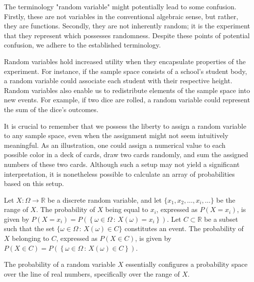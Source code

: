 The terminology "random variable" might potentially lead to some confusion. Firstly, these are not variables in the conventional algebraic sense, but rather, they are functions. Secondly, they are not inherently random; it is the experiment that they represent which possesses randomness. Despite these points of potential confusion, we adhere to the established terminology.

Random variables hold increased utility when they encapsulate properties of the experiment. For instance, if the sample space consists of a school's student body, a random variable could associate each student with their respective height. Random variables also enable us to redistribute elements of the sample space into new events. For example, if two dice are rolled, a random variable could represent the sum of the dice's outcomes.

It is crucial to remember that we possess the liberty to assign a random variable to any sample space, even when the assignment might not seem intuitively meaningful. As an illustration, one could assign a numerical value to each possible color in a deck of cards, draw two cards randomly, and sum the assigned numbers of these two cards. Although such a setup may not yield a significant interpretation, it is nonetheless possible to calculate an array of probabilities based on this setup.

\begin{definition}
Let $X : \Omega \rightarrow \mathbb{R}$ be a discrete random variable, and let $\{ x_1, x_2, \ldots, x_i, \ldots \}$ be the range of $X$. The probability of $X$ being equal to $x_i$, expressed as $P\left(X = x_i \right)$, is given by $P\left( X = x_i \right)=P \left( \left\{ \omega \in \Omega \,:\, X \left( \omega \right) = x_i\right\} \right)$. Let $C \subset \mathbb{R}$ be a subset such that the set $\{ \omega \in \Omega \,:\, X \left( \omega \right) \in C\}$ constitutes an event. The probability of $X$ belonging to $C$, expressed as $P\left(X \in C \right)$, is given by $P\left( X \in C \right)=P \left( \left\{ \omega \in \Omega \,:\, X \left( \omega \right) \in C\right\} \right)$.
\end{definition}

The probability of a random variable $X$ essentially configures a probability space over the line of real numbers, specifically over the range of $X$. 

